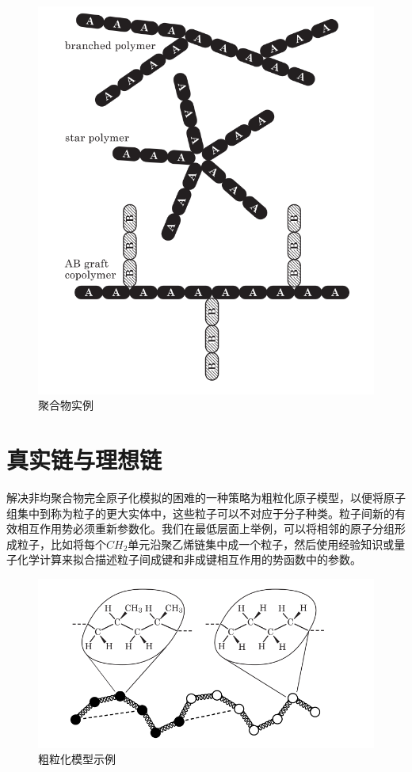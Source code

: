 \begin{figure}[h]
	\centering
	\includegraphics[scale=0.5
	]{Contents/chapter2/figures/1-2.png}
	\caption{聚合物实例}
\end{figure}



\section{真实链与理想链}
解决非均聚合物完全原子化模拟的困难的一种策略为粗粒化原子模型，以便将原子组集中到称为粒子的更大实体中，这些粒子可以不对应于分子种类。粒子间新的有效相互作用势必须重新参数化。我们在最低层面上举例，可以将相邻的原子分组形成粒子，比如将每个$CH_2$单元沿聚乙烯链集中成一个粒子，然后使用经验知识或量子化学计算来拟合描述粒子间成键和非成键相互作用的势函数中的参数。

\begin{figure}[h]
\centering
\includegraphics[scale=0.5
]{Contents/chapter2/figures/1-3.png}
\caption{粗粒化模型示例}
\end{figure}

